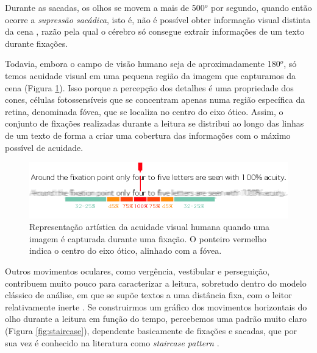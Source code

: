 \documentclass[12pt]{article}
\begin{document}
		Durante as sacadas, os olhos se movem a mais de 500$^o$ por segundo, quando então ocorre a \textit{supressão sacádica}, isto é, não é possível obter informação visual distinta da cena \cite{Rayner-1998}, razão pela qual o cérebro só consegue extrair informações de um texto durante fixações.
		
		Todavia, embora o campo de visão humano seja de aproximadamente 180$^o$, só temos acuidade visual em uma pequena região da imagem que capturamos da cena (Figura \ref{fig:acuidade}). Isso porque a percepção dos detalhes é uma propriedade dos cones, células fotossensíveis que se concentram apenas numa região específica da retina, denominada fóvea, que se localiza no centro do eixo ótico. Assim, o conjunto de fixações realizadas durante a leitura se distribui ao longo das linhas de um texto de forma a criar uma cobertura das informações com o máximo possível de acuidade.
		
		\begin{figure}[!ht]
			\centering
			\includegraphics[width=14cm]{imgs/acuidade.png}
			\caption{\footnotesize {Representação artística da acuidade visual humana quando uma imagem é capturada durante uma fixação. O ponteiro vermelho indica o centro do eixo ótico, alinhado com a fóvea. \cite{Acuidade}}}
			\label{fig:acuidade}
			\vspace{5mm}
		\end{figure}
		
		Outros movimentos oculares, como vergência, vestibular e perseguição, contribuem muito pouco para caracterizar a leitura, sobretudo dentro do modelo clássico de análise, em que se supõe textos a uma distância fixa, com o leitor relativamente inerte \cite{Lee-1999}. Se construirmos um gráfico dos movimentos horizontais do olho durante a leitura em função do tempo, percebemos uma padrão muito claro (Figura \ref{fig:staircase}), dependente basicamente de fixações e sacadas, que por sua vez é conhecido na literatura como \textit{staircase pattern} \cite{Lee-1999}. 
		
\end{document}
